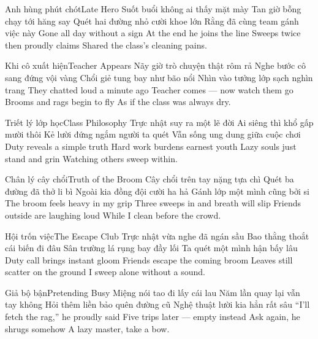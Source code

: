 \begin{tutuyetbox}{Anh hùng phút chót}{Late Hero}
Suốt buổi không ai thấy mặt mày
Tan giờ bỗng chạy tới hăng say
Quét hai đường nhỏ cười khoe lớn
Rằng đã cùng team gánh việc này
\tcblower
Gone all day without a sign
At the end he joins the line
Sweeps twice then proudly claims
Shared the class's cleaning pains.
\end{tutuyetbox}

\begin{tutuyetbox}{Khi cô xuất hiện}{Teacher Appears}
Nãy giờ trò chuyện thật rôm rả
Nghe bước cô sang đứng vội vàng
Chổi giẻ tung bay như bão nổi
Nhìn vào tưởng lớp sạch nghìn trang
\tcblower
They chatted loud a minute ago
Teacher comes — now watch them go
Brooms and rags begin to fly
As if the class was always dry.
\end{tutuyetbox}

\begin{tutuyetbox}{Triết lý lớp học}{Class Philosophy}
Trực nhật suy ra một lẽ đời
Ai siêng thì khổ gấp mười thôi
Kẻ lười đứng ngắm người ta quét
Vẫn sống ung dung giữa cuộc chơi
\tcblower
Duty reveals a simple truth
Hard work burdens earnest youth
Lazy souls just stand and grin
Watching others sweep within.
\end{tutuyetbox}

\begin{tutuyetbox}{Chân lý cây chổi}{Truth of the Broom}
Cây chổi trên tay nặng tựa chì
Quét ba đường đã thở li bì
Ngoài kia đồng đội cười ha hả
Gánh lớp một mình cũng bởi si
\tcblower
The broom feels heavy in my grip
Three sweeps in and breath will slip
Friends outside are laughing loud
While I clean before the crowd.
\end{tutuyetbox}

\begin{tutuyetbox}{Hội trốn việc}{The Escape Club}
Trực nhật vừa nghe đã ngán sầu
Bao thằng thoắt cái biến đi đâu
Sân trường lá rụng bay đầy lối
Ta quét một mình hận bấy lâu
\tcblower
Duty call brings instant gloom
Friends escape the coming broom
Leaves still scatter on the ground
I sweep alone without a sound.
\end{tutuyetbox}

\begin{tutuyetbox}{Giả bộ bận}{Pretending Busy}
Miệng nói tao đi lấy cái lau
Năm lần quay lại vẫn tay không
Hỏi thêm liền bảo quên đường cũ
Nghệ thuật lười kia hẳn rất sâu
\tcblower
“I’ll fetch the rag,” he proudly said
Five trips later — empty instead
Ask again, he shrugs somehow
A lazy master, take a bow.
\end{tutuyetbox}

